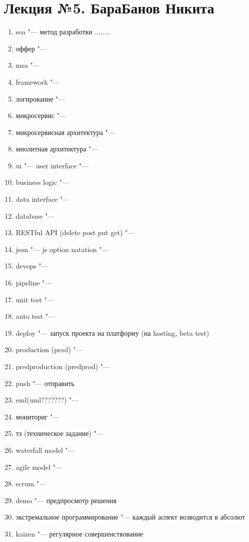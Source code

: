 \documentclass{article}
\begin{document}
\section{Лекция №5. БараБанов Никита}
\begin{enumerate}
    \item soa "--- метод разработки ........
    \item оффер "--- 
    \item msa "--- 
    \item framework "--- 
    \item логирование "---
    \item микросервис "---
    \item микросервисная архитектура "---
    \item мнолитная архитектура "---
    \item ui "--- user interface "---
    \item business logic "---
    \item data interface "---
    \item database "---
    \item RESTful API (delete post put get) "---
    \item json "--- js option natation "---
    \item devops "---
    \item pipeline "---
    \item unit test "---
    \item auto test "---
    \item deploy "--- запуск проекта на платформу (на hosting, beta test)
    \item production (prod) "---
    \item predproduction (predprod) "---
    \item push "--- отправить
    \item eml(uml???????) "---
    \item мониториг "---
    \item тз (техническое задание) "--- 
    \item waterfall model "---
    \item agile model "---
    \item scrum "---
    \item demo "--- предпросмотр решения
    \item экстремальное программирование "--- каждый аспект возводится в  абсолют
    \item kaizen "--- регулярное совершенствование 
\end{enumerate}
\end{document}
